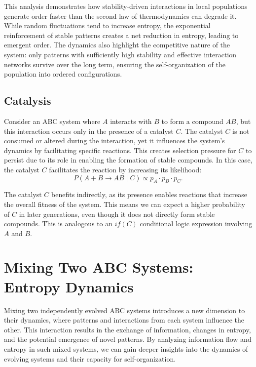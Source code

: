 \documentclass[entropy,article,submit,pdftex,moreauthors]{Definitions/mdpi}
\begin{document}
This analysis demonstrates how stability-driven interactions in local populations generate order faster than the second law of thermodynamics can degrade it. While random fluctuations tend to increase entropy, the exponential reinforcement of stable patterns creates a net reduction in entropy, leading to emergent order. The dynamics also highlight the competitive nature of the system: only patterns with sufficiently high stability and effective interaction networks survive over the long term, ensuring the self-organization of the population into ordered configurations.

\subsection{Catalysis}

Consider an ABC system where \( A \) interacts with \( B \) to form a compound \( AB \), but this interaction occurs only in the presence of a catalyst \( C \). The catalyst \( C \) is not consumed or altered during the interaction, yet it influences the system's dynamics by facilitating specific reactions. This creates selection pressure for \( C \) to persist due to its role in enabling the formation of stable compounds. In this case, the catalyst \( C \) facilitates the reaction by increasing its likelihood:
\[
P(A + B \to AB \mid C) \propto p_A \cdot p_B \cdot p_C.
\]

The catalyst \( C \) benefits indirectly, as its presence enables reactions that increase the overall fitness of the system. This means we can expect a higher probability of \( C \) in later generations, even though it does not directly form stable compounds. This is analogous to an \( if(C) \) conditional logic expression involving \( A \) and \( B \).

\section{Mixing Two ABC Systems: Entropy Dynamics}

Mixing two independently evolved ABC systems introduces a new dimension to their dynamics, where patterns and interactions from each system influence the other. This interaction results in the exchange of information, changes in entropy, and the potential emergence of novel patterns. By analyzing information flow and entropy in such mixed systems, we can gain deeper insights into the dynamics of evolving systems and their capacity for self-organization.
\end{document}
